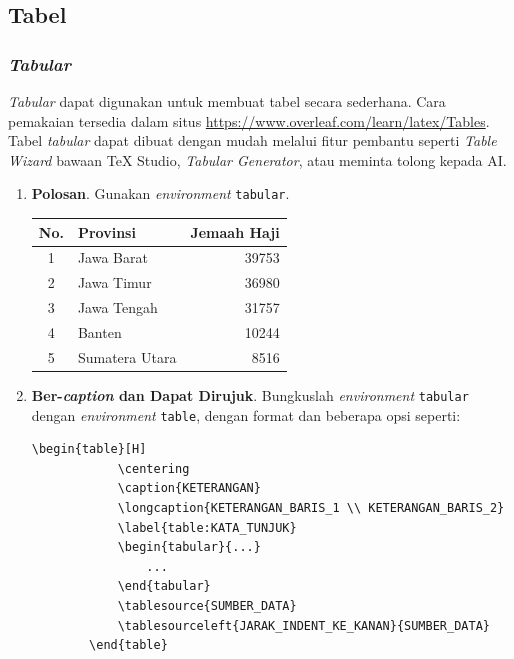 \subsection{Tabel}

\subsubsection{\textit{Tabular}}

\textit{Tabular} dapat digunakan untuk membuat tabel secara sederhana. Cara pemakaian tersedia dalam situs \url{https://www.overleaf.com/learn/latex/Tables}. Tabel \textit{tabular} dapat dibuat dengan mudah melalui fitur pembantu seperti \textit{Table Wizard} bawaan TeX Studio, \textit{Tabular Generator}, atau meminta tolong kepada AI.

\begin{enumerate}[label=\alph*.]
    \item \textbf{Polosan}. Gunakan \textit{environment} \texttt{tabular}.
    \begin{center}
        \begin{tabular}{c l r}
            \hline
            No. & Provinsi & Jemaah Haji \\
            \hline
            1 & Jawa Barat & 39753 \\
            2 & Jawa Timur & 36980 \\
            3 & Jawa Tengah & 31757 \\
            4 & Banten & 10244 \\
            5 & Sumatera Utara & 8516 \\
            \hline
        \end{tabular}
    \end{center}
    
    \item \textbf{Ber-\textit{caption} dan Dapat Dirujuk}. Bungkuslah \textit{environment} \texttt{tabular} dengan \textit{environment} \texttt{table}, dengan format dan beberapa opsi seperti:
    \begin{lstlisting}[]
        \begin{table}[H]
            \centering
            \caption{KETERANGAN}
            \longcaption{KETERANGAN_BARIS_1 \\ KETERANGAN_BARIS_2}
            \label{table:KATA_TUNJUK}
            \begin{tabular}{...}
                ...
            \end{tabular}
            \tablesource{SUMBER_DATA}
            \tablesourceleft{JARAK_INDENT_KE_KANAN}{SUMBER_DATA}
        \end{table}
    \end{lstlisting}
    

\end{enumerate}
